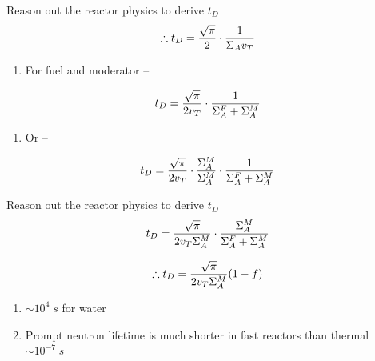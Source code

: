 \documentclass[aspectratio=1610,pdftex,dvipsnames,compress,xcolor={dvipsnames}]{beamer}
\begin{document}
\begin{frame}{Reason out the reactor physics to derive $t_D$}
    \begin{equation}
        \LARGE
        \therefore t_D = \frac{\sqrt{\pi}}{2} \cdot \frac{1}{\Sigma_A v_T}
    \end{equation}

    \vspace*{\fill}

    \begin{enumerate}[series=outerlist,topsep=0pt,itemsep=21pt,leftmargin=*,label=(\arabic*)]
        \item[]For fuel and moderator --
    \end{enumerate}

    \vspace*{\fill}

    \begin{equation}
        \LARGE
        t_D = \frac{\sqrt{\pi}}{2 v_T} \cdot \frac{1}{\Sigma_A^F + \Sigma_A^M}
    \end{equation}

    \vspace*{\fill}

    \begin{enumerate}[series=outerlist,topsep=0pt,itemsep=21pt,leftmargin=*,label=(\arabic*)]
        \item[]Or --
    \end{enumerate}

    \begin{equation}
        \LARGE
        t_D = \frac{\sqrt{\pi}}{2 v_T} \cdot \frac{\Sigma_A^M}{\Sigma_A^M} \cdot \frac{1}{\Sigma_A^F + \Sigma_A^M}
    \end{equation}
\end{frame}


\begin{frame}{Reason out the reactor physics to derive $t_D$}
    \begin{equation}
        \LARGE
        t_D = \frac{\sqrt{\pi}}{2 v_T \Sigma_A^M} \cdot \frac{\Sigma_A^M}{\Sigma_A^F + \Sigma_A^M}
    \end{equation}

    \begin{equation}
        \LARGE
        \therefore t_D = \frac{\sqrt{\pi}}{2 v_T \Sigma_A^M}(1 - f)
    \end{equation}

    \vspace*{\fill}

    \begin{enumerate}[series=outerlist,topsep=0pt,itemsep=21pt,leftmargin=*,label=(\arabic*)]
        \item[]$\sim 10^4 \; s$ for water
        \item[]Prompt neutron lifetime is much shorter in fast reactors than thermal $\sim 10^{-7} \; s$
    \end{enumerate}
\end{frame}
\end{document}
